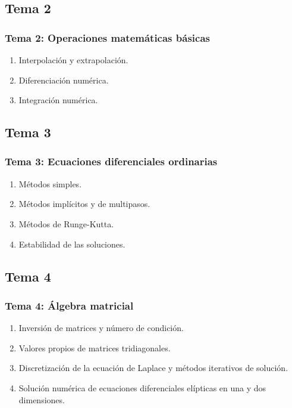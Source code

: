 \documentclass[12pt]{beamer}
\begin{document}
\subsection*{Tema 2}

\begin{frame}
\frametitle{\textbf{Tema 2: Operaciones matemáticas básicas}}
\begin{enumerate}[<+->]
\item Interpolación y extrapolación.
\item Diferenciación numérica.
\item Integración numérica.
\end{enumerate}
\end{frame}

\subsection*{Tema 3}

\begin{frame}
\frametitle{\textbf{Tema 3: Ecuaciones diferenciales ordinarias}}
\begin{enumerate}[<+->]
\item Métodos simples.
\item Métodos implícitos y de multipasos.
\item Métodos de Runge-Kutta.
\item Estabilidad de las soluciones.
\end{enumerate}
\end{frame}

\subsection*{Tema 4}

\begin{frame}
\frametitle{\textbf{Tema 4: Álgebra matricial}}
\begin{enumerate}[<+->]
\item Inversión de matrices y número de condición.
\item Valores propios de matrices tridiagonales.
\item Discretización de la ecuación de Laplace y métodos iterativos de solución.
\item Solución numérica de ecuaciones diferenciales elípticas en una y dos dimensiones.
\end{enumerate}
\end{frame}
\end{document}
